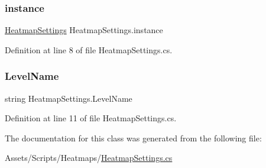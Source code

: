 \subsubsection{\texorpdfstring{instance}{instance}}
{\footnotesize\ttfamily \mbox{\hyperlink{class_heatmap_settings}{Heatmap\+Settings}} Heatmap\+Settings.\+instance\hspace{0.3cm}{\ttfamily [static]}}



Definition at line 8 of file Heatmap\+Settings.\+cs.

\mbox{\label{class_heatmap_settings_a337123e4b7b337e09c10a4bece5a5578}} 
\subsubsection{\texorpdfstring{Level\+Name}{LevelName}}
{\footnotesize\ttfamily string Heatmap\+Settings.\+Level\+Name}



Definition at line 11 of file Heatmap\+Settings.\+cs.



The documentation for this class was generated from the following file\+:\begin{DoxyCompactItemize}
\item 
Assets/\+Scripts/\+Heatmaps/\mbox{\hyperlink{_heatmap_settings_8cs}{Heatmap\+Settings.\+cs}}\end{DoxyCompactItemize}
